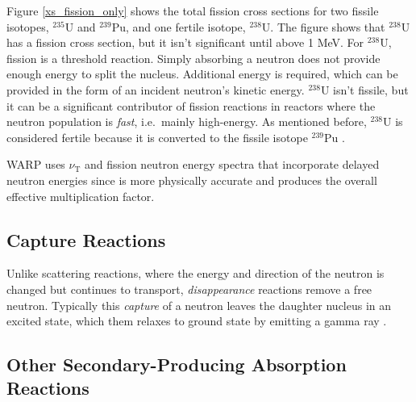 
Figure \ref{xs_fission_only} shows the total fission cross sections for two fissile isotopes, $^{235}$U and $^{239}$Pu, and one fertile isotope, $^{238}$U.  The figure shows that  $^{238}$U has a fission cross section, but it isn't significant until above 1 MeV.  For $^{238}$U, fission is a threshold reaction.  Simply absorbing a neutron does not provide enough energy to split the nucleus.  Additional energy is required, which can be provided in the form of an incident neutron's kinetic energy.  $^{238}$U isn't fissile, but it can be a significant contributor of fission reactions in reactors where the neutron population is \emph{fast}, i.e.\ mainly high-energy.  As mentioned before, $^{238}$U is considered fertile because it is converted to the fissile isotope $^{239}$Pu \cite{duderstadt}.  
  
WARP uses $\nu_\mathrm{T}$ and fission neutron energy spectra that incorporate delayed neutron energies since is more physically accurate and produces the overall effective multiplication factor.  

\subsection{Capture Reactions}

Unlike scattering reactions, where the energy and direction of the neutron is changed but continues to transport, \emph{disappearance} reactions remove a free neutron.  Typically this \emph{capture} of a neutron leaves the daughter nucleus in an excited state, which them relaxes to ground state by emitting a gamma ray \cite{krane}.


\subsection{Other Secondary-Producing Absorption Reactions}

